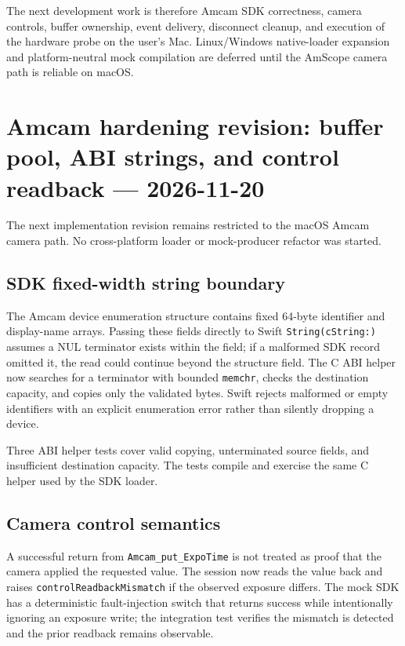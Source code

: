 \documentclass[11pt,a4paper]{report}
\begin{document}
The next development work is therefore Amcam SDK correctness, camera controls, buffer ownership, event delivery, disconnect cleanup, and execution of the hardware probe on the user's Mac. Linux/Windows native-loader expansion and platform-neutral mock compilation are deferred until the AmScope camera path is reliable on macOS.



\section{Amcam hardening revision: buffer pool, ABI strings, and control readback --- 2026-11-20}

The next implementation revision remains restricted to the macOS Amcam camera path. No cross-platform loader or mock-producer refactor was started.

\subsection{SDK fixed-width string boundary}

The Amcam device enumeration structure contains fixed 64-byte identifier and display-name arrays. Passing these fields directly to Swift \texttt{String(cString:)} assumes a NUL terminator exists within the field; if a malformed SDK record omitted it, the read could continue beyond the structure field. The C ABI helper now searches for a terminator with bounded \texttt{memchr}, checks the destination capacity, and copies only the validated bytes. Swift rejects malformed or empty identifiers with an explicit enumeration error rather than silently dropping a device.

Three ABI helper tests cover valid copying, unterminated source fields, and insufficient destination capacity. The tests compile and exercise the same C helper used by the SDK loader.

\subsection{Camera control semantics}

A successful return from \texttt{Amcam\_put\_ExpoTime} is not treated as proof that the camera applied the requested value. The session now reads the value back and raises \texttt{controlReadbackMismatch} if the observed exposure differs. The mock SDK has a deterministic fault-injection switch that returns success while intentionally ignoring an exposure write; the integration test verifies the mismatch is detected and the prior readback remains observable.
\end{document}
